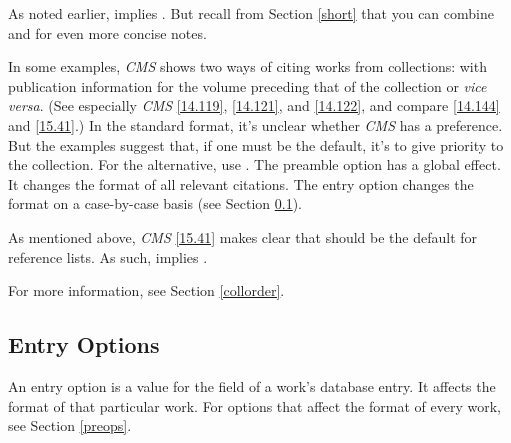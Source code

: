 \documentclass[11pt,letterpaper,oneside]{article}
\begin{document}
\begin{optionlist}
As noted earlier,  implies . But recall
from Section \ref{short} that you can combine  and
 for even more concise notes.


In some examples, \textit{CMS} shows two ways of citing works from
collections: with publication information for the volume preceding
that of the collection or \textit{vice versa}. (See especially
\textit{CMS} \ref{14.119}, \ref{14.121}, and \ref{14.122}, and compare
\ref{14.144} and \ref{15.41}.) In the standard format, it's unclear
whether \textit{CMS} has a preference. But the examples suggest that,
if one must be the default, it's to give priority to the collection.
For the alternative, use . The preamble option
 has a global effect. It changes the format of all
relevant citations. The entry option  changes the format
on a case-by-case basis (see Section \ref{entryops}).

As mentioned above, \textit{CMS} \ref{15.41} makes clear that
 should be the default for reference lists. As such,
 implies .

For more information, see Section \ref{collorder}.

\end{optionlist}

\subsection{Entry Options}
\label{entryops}

An entry option is a value for the  field of a
work's database entry. It affects the format of that particular work.
For options that affect the format of every work, see Section
\ref{preops}.
\end{document}
